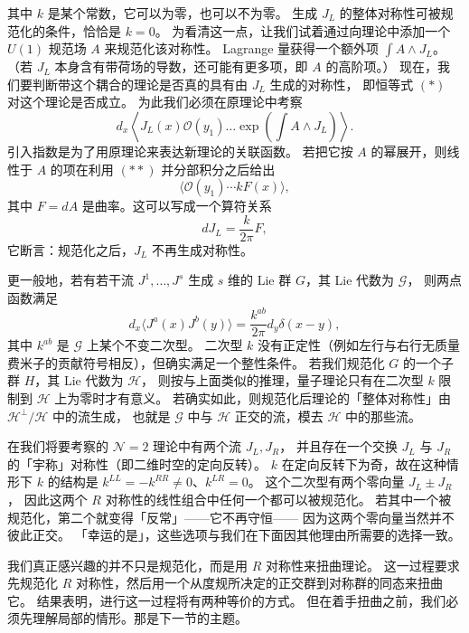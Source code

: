 其中 $k$ 是某个常数，它可以为零，也可以不为零。
生成 $J_L$ 的整体对称性可被规范化的条件，恰恰是 $k=0$。
为看清这一点，让我们试着通过向理论中添加一个 $U(1)$ 规范场 $A$ 来规范化该对称性。
Lagrange 量获得一个额外项 $\int A\wedge J_L$。
（若 $J_L$ 本身含有带荷场的导数，还可能有更多项，即 $A$ 的高阶项。）
现在，我们要判断带这个耦合的理论是否真的具有由 $J_L$ 生成的对称性，
即恒等式 $(\ast)$ 对这个理论是否成立。
为此我们必须在原理论中考察
\[
d_x\left\langle J_L(x)\mathcal{O}(y_1)\dots\exp\left(\int A\wedge J_L\right)\right\rangle.
\]
引入指数是为了用原理论来表达新理论的关联函数。
若把它按 $A$ 的幂展开，则线性于 $A$ 的项在利用 $(\ast\ast)$ 并分部积分之后给出
\[
\bigl\langle \mathcal{O}(y_1)\cdots kF(x)\bigr\rangle,
\]
其中 $F=dA$ 是曲率。这可以写成一个算符关系
\[
dJ_L=\frac{k}{2\pi}F,
\]
它断言：规范化之后，$J_L$ 不再生成对称性。

更一般地，若有若干流 $J^1,\dots,J^s$ 生成 $s$ 维的 Lie 群 $G$，其 Lie 代数为 $\mathcal{G}$，
则两点函数满足
\[
d_x\bigl\langle J^a(x)J^b(y)\bigr\rangle=\frac{k^{ab}}{2\pi}d_y\delta(x-y),
\]
其中 $k^{ab}$ 是 $\mathcal{G}$ 上某个不变二次型。
二次型 $k$ 没有正定性（例如左行与右行无质量费米子的贡献符号相反），但确实满足一个整性条件。
若我们规范化 $G$ 的一个子群 $H$，其 Lie 代数为 $\mathcal{H}$，
则按与上面类似的推理，量子理论只有在二次型 $k$ 限制到 $\mathcal{H}$ 上为零时才有意义。
若确实如此，则规范化后理论的「整体对称性」由 $\mathcal{H}^{\perp}/\mathcal{H}$ 中的流生成，
也就是 $\mathcal{G}$ 中与 $\mathcal{H}$ 正交的流，模去 $\mathcal{H}$ 中的那些流。

在我们将要考察的 $\mathcal{N}=2$ 理论中有两个流 $J_L,J_R$，
并且存在一个交换 $J_L$ 与 $J_R$ 的「宇称」对称性（即二维时空的定向反转）。
$k$ 在定向反转下为奇，故在这种情形下 $k$ 的结构是
$k^{LL}=-k^{RR}\neq0$、$k^{LR}=0$。
这个二次型有两个零向量 $J_L\pm J_R$，
因此这两个 $R$ 对称性的线性组合中任何一个都可以被规范化。
若其中一个被规范化，第二个就变得「反常」——它不再守恒——
因为这两个零向量当然并不彼此正交。
「幸运的是」，这些选项与我们在下面因其他理由所需要的选择一致。

我们真正感兴趣的并不只是规范化，而是用 $R$ 对称性来扭曲理论。
这一过程要求先规范化 $R$ 对称性，然后用一个从度规所决定的正交群到对称群的同态来扭曲它。
结果表明，进行这一过程将有两种等价的方式。
但在着手扭曲之前，我们必须先理解局部的情形。那是下一节的主题。


